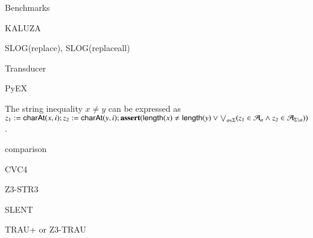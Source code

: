 
Benchmarks

KALUZA

SLOG(replace), SLOG(replaceall)

Transducer

PyEX \cite{ReynoldsWBBLT17}

\begin{remark}
The string inequality $x \neq y$ can be expressed as $z_1:=\mathsf{charAt}(x,i); z_2 := \mathsf{charAt}(y,i); \textbf{assert}(\mathsf{length}(x) \neq \mathsf{length}(y) \vee \bigvee_{a \in \Sigma} (z_1 \in \mathcal{A}_a \wedge z_2 \in \mathcal{A}_{\Sigma \setminus a}))$. 
\end{remark}


comparison

CVC4

Z3-STR3

SLENT

TRAU+ or Z3-TRAU

